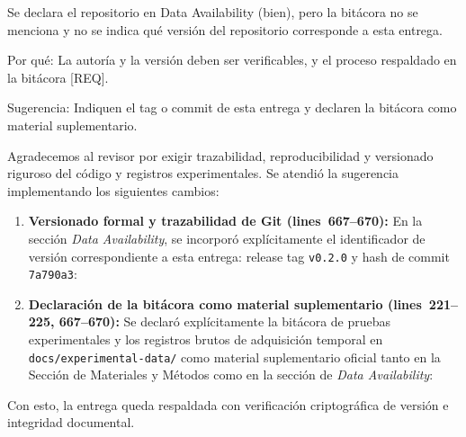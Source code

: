 \documentclass{LabDSTresponse}
\begin{document}
{Se declara el repositorio en Data Availability (bien), pero la bitácora no se menciona y no se indica qué versión del repositorio corresponde a esta entrega.

Por qué: La autoría y la versión deben ser verificables, y el proceso respaldado en la bitácora [REQ].

Sugerencia: Indiquen el tag o commit de esta entrega y declaren la bitácora como material suplementario.}
{Agradecemos al revisor por exigir trazabilidad, reproducibilidad y versionado riguroso del código y registros experimentales. Se atendió la sugerencia implementando los siguientes cambios:
\begin{enumerate}
    \item \textbf{Versionado formal y trazabilidad de Git (lines~667--670):} En la sección \textit{Data Availability}, se incorporó explícitamente el identificador de versión correspondiente a esta entrega: release tag \texttt{v0.2.0} y hash de commit \texttt{7a790a3}:
    \item \textbf{Declaración de la bitácora como material suplementario (lines~221--225, 667--670):} Se declaró explícitamente la bitácora de pruebas experimentales y los registros brutos de adquisición temporal en \texttt{docs/experimental-data/} como material suplementario oficial tanto en la Sección de Materiales y Métodos como en la sección de \textit{Data Availability}:
\end{enumerate}
Con esto, la entrega queda respaldada con verificación criptográfica de versión e integridad documental.}
\end{document}
